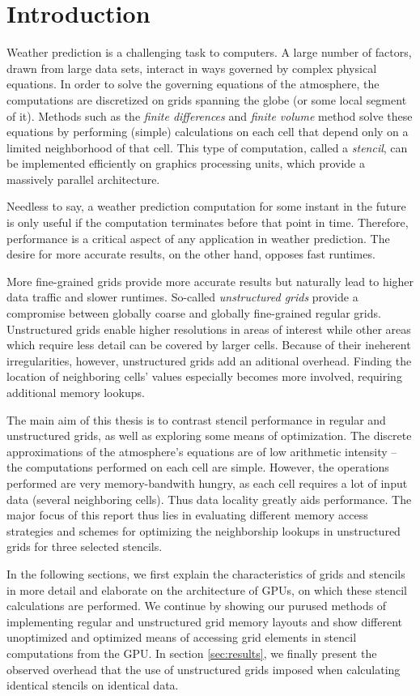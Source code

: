 \chapter*{Introduction}

Weather prediction is a challenging task to computers. A large number of factors, drawn from large data sets, interact in ways governed by complex physical equations. In order to solve the governing equations of the atmosphere, the computations are discretized on grids spanning the globe (or some local segment of it). Methods such as the \emph{finite differences} and \emph{finite volume} method solve these equations by performing (simple) calculations on each cell that depend only on a limited neighborhood of that cell. This type of computation, called a \emph{stencil}, can be implemented efficiently on graphics processing units, which provide a massively parallel architecture. 

Needless to say, a weather prediction computation for some instant in the future is only useful if the computation terminates before that point in time. Therefore, performance is a critical aspect of any application in weather prediction. The desire for more accurate results, on the other hand, opposes fast runtimes.

More fine-grained grids provide more accurate results but naturally lead to higher data traffic and slower runtimes. So-called \emph{unstructured grids} provide a compromise between globally coarse and globally fine-grained regular grids. Unstructured grids enable higher resolutions in areas of interest while other areas which require less detail can be covered by larger cells. Because of their ineherent irregularities, however, unstructured grids add an aditional overhead. Finding the location of neighboring cells' values especially becomes more involved, requiring additional memory lookups.

The main aim of this thesis is to contrast stencil performance in regular and unstructured grids, as well as exploring some means of optimization. The discrete approximations of the atmosphere's equations are of low arithmetic intensity -- the computations performed on each cell are simple. However, the operations performed are very memory-bandwith hungry, as each cell requires a lot of input data (several neighboring cells). Thus data locality greatly aids performance. The major focus of this report thus lies in evaluating different memory access strategies and schemes for optimizing the neighborship lookups in unstructured grids for three selected stencils.

In the following sections, we first explain the characteristics of grids and stencils in more detail and elaborate on the architecture of GPUs, on which these stencil calculations are performed. We continue by showing our purused methods of implementing regular and unstructured grid memory layouts and show different unoptimized and optimized means of accessing grid elements in stencil computations from the GPU. In section \ref{sec:results}, we finally present the observed overhead that the use of unstructured grids imposed when calculating identical stencils on identical data.